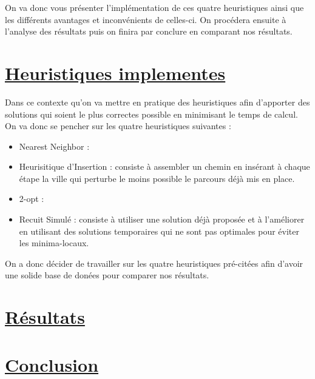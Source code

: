 \documentclass{article}
\begin{document}
On va donc vous présenter l’implémentation de ces quatre heuristiques ainsi que les différents avantages et inconvénients de celles-ci. 
On procédera ensuite à l’analyse des résultats puis on finira par conclure en comparant nos résultats. 
\newpage

\section*{\underline{Heuristiques implementes}}
Dans ce contexte qu’on va mettre en pratique des heuristiques afin d’apporter des solutions qui soient le plus correctes possible en minimisant le temps de calcul.
On va donc se pencher sur les quatre heuristiques suivantes :
\begin{itemize}
    \item Nearest Neighbor : 
    \item Heurisitique d’Insertion : consiste à assembler un chemin en insérant à chaque étape la ville qui perturbe le moins possible le parcours déjà mis en place. 
    \item 2-opt :
    \item Recuit Simulé : consiste à utiliser une solution déjà proposée et à l’améliorer en utilisant des solutions temporaires qui ne sont pas optimales pour éviter les minima-locaux. 
\end{itemize}
On a donc décider de travailler sur les quatre heuristiques pré-citées afin d'avoir une solide base de donées pour comparer nos résultats.

\section*{\underline{Résultats}}

\newpage

\section*{\underline{Conclusion}}

\newpage


\end{document}
